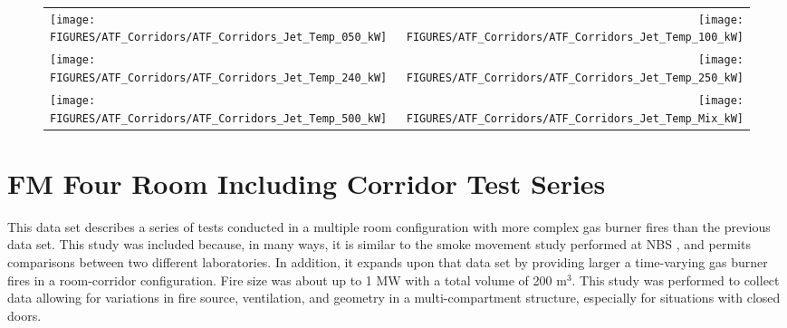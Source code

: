 \begin{figure}
\begin{tabular*}{\textwidth}{l@{\extracolsep{\fill}}r}
\texttt{[image: FIGURES/ATF\_Corridors/ATF\_Corridors\_Jet\_Temp\_050\_kW]} &
\texttt{[image: FIGURES/ATF\_Corridors/ATF\_Corridors\_Jet\_Temp\_100\_kW]} \\
\texttt{[image: FIGURES/ATF\_Corridors/ATF\_Corridors\_Jet\_Temp\_240\_kW]} &
\texttt{[image: FIGURES/ATF\_Corridors/ATF\_Corridors\_Jet\_Temp\_250\_kW]} \\
\texttt{[image: FIGURES/ATF\_Corridors/ATF\_Corridors\_Jet\_Temp\_500\_kW]} &
\texttt{[image: FIGURES/ATF\_Corridors/ATF\_Corridors\_Jet\_Temp\_Mix\_kW]} 
\end{tabular*}
\end{figure}

\clearpage

\section{FM Four Room Including Corridor Test Series}

This data set describes a series of tests conducted in a multiple room configuration with more complex gas burner fires than the previous data set.  This study \cite{Heskestad:1986} was included because, in many ways, it is similar to the smoke movement study performed at NBS \cite{Peacock:1988}, and permits comparisons between two different laboratories. In addition, it expands upon that data set by providing larger a time-varying gas burner fires in a room-corridor configuration. Fire size was about up to 1 MW with a total volume of 200 m$^3$. This study was performed to collect data allowing for variations in fire source, ventilation, and geometry in a multi-compartment structure, especially for situations with closed doors.

